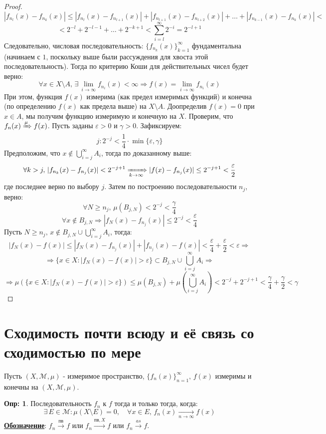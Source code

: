 \documentclass[12pt]{article}
\newcommand{\MM}{\mathcal{M}}
\newcommand{\VE}{\varepsilon}
\theoremstyle{definition}
\newtheorem{defn}{Опр:}
\newcommand{\ddsum}[2]{\displaystyle\sum\limits_{#1}^{#2}}
\begin{document}
\begin{proof}
	$$
		|f_{n_l}(x) - f_{n_k}(x)| \leq |f_{n_l}(x) - f_{n_{l+1}}(x)| + |f_{n_{l+1}}(x) - f_{n_{l+2}}(x)| + \dotsc + |f_{n_{k-1}}(x) - f_{n_k}(x)| <
	$$
	$$
		< 2^{-l} + 2^{-l -1} + \dotsc + 2^{-k + 1} < \ddsum{i = l}{\infty}2^{-i} = 2^{-l + 1}
	$$
	Следовательно, числовая последовательность: $\{f_{n_k}(x)\}_{k = 1}^{\infty}$ фундаментальна (начинаем с $1$, поскольку выше были рассуждения для хвоста этой последовательность). Тогда по критерию Коши для действительных чисел будет верно:
	$$
		\forall x \in X \setminus A, \, \exists \, \lim\limits_{i \to \infty}f_{n_i}(x) < \infty \Rightarrow f(x) = \lim\limits_{i \to \infty}f_{n_i}(x)
	$$
	При этом, функция $f(x)$ измерима (как предел измеримых функций) и конечна (по определению $f(x)$ как предела выше) на $X \setminus A$. Доопределив $f(x) = 0$ при $x \in A$, мы получим функцию измеримую и конечную на $X$. Проверим, что $f_n(x) \xRightarrow{\mu} f(x)$. Пусть заданы $\VE > 0$ и $\gamma > 0$. Зафиксируем: 
	$$
		j\colon 2^{-j} < \dfrac{1}{4}{\cdot}\min\{\VE,\gamma\}
	$$
	Предположим, что $x \not\in \bigcup\limits_{i = j}^{\infty}A_i$, тогда по доказанному выше:
	$$
		\forall k > j, \, |f_{n_k}(x) -f_{n_j}(x)| < 2^{-j +1} \xRightarrow[k \to \infty]{} |f(x) - f_{n_j}(x)| \leq 2^{-j+1} < \dfrac{\VE}{2}
	$$
	где последнее верно по выбору $j$. Затем по построению последовательности $n_j$, верно:
	$$
		\forall N \geq n_j, \, \mu(B_{j,N}) < 2^{-j} < \dfrac{\gamma}{4}
	$$
	$$
		\forall x\not\in B_{j,N} \Rightarrow |f_N(x) - f_{n_j}(x)| \leq 2^{-j} < \dfrac{\VE}{4}
	$$
	Пусть $N \geq n_j, \, x \not\in B_{j,N} \cup \bigcup\limits_{ i = j}^{\infty}A_i$, тогда:
	$$
		|f_N(x) - f(x)| \leq |f_N(x) - f_{n_j}(x)| + |f_{n_j}(x) - f(x)| < \dfrac{\VE}{4} + \dfrac{\VE}{2} < \VE \Rightarrow
	$$
	$$
		\Rightarrow \{x \in X \colon |f_N(x) - f(x)| > \VE\} \subset B_{j,N} \cup \bigcup\limits_{i = j}^{\infty}A_i \Rightarrow 
	$$
	$$
		\Rightarrow \mu(\{x \in X \colon |f_N(x) - f(x)| > \VE\}) \leq \mu(B_{j,N}) + \mu\left(\bigcup\limits_{i = j}^{\infty}A_i\right) < 2^{-j} + 2^{-j + 1} < \dfrac{\gamma}{4} + \dfrac{\gamma}{2} < \gamma
	$$
\end{proof}
\newpage
\section*{Сходимость почти всюду и её связь со сходимостью по мере}
Пусть $(X,\MM,\mu)$ - измеримое пространство, $\{f_n(x)\}_{n = 1}^{\infty}, \, f(x)$ измеримы и конечны на $(X,\MM,\mu)$.

\begin{defn}
	Последовательность $f_n$  к $f$ тогда и только тогда, когда:
	$$
		\exists \, E \in \MM \colon \mu(X \setminus E) = 0, \quad \forall x \in E, \, f_n(x) \xrightarrow[n \to \infty]{} f(x)
	$$
	\textbf{\uline{Обозначение}}: $f_n \xrightarrow{\text{пв}}f$ или $f_n \xrightarrow{\text{пв}, X} f$ или $f_n \xrightarrow{as} f$.
\end{defn}
\end{document}
